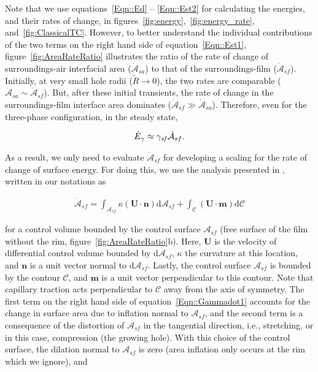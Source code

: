 \begin{subappendices}
	Note that we use equations~\eqref{Eqn::Ed} -- \eqref{Eqn::Est2} for calculating the energies, and their rates of change, in figures~\ref{fig:energy},~\ref{fig:energy_rate}, and~\ref{fig:ClassicalTC}. However, to better understand the individual contributions of the two terms on the right hand side of equation~\eqref{Eqn::Est1}, figure~\ref{fig:AreaRateRatio} illustrates the ratio of the rate of change of surroundings-air interfacial area ($\dot{\mathcal{A}}_{sa}$) to that of the surroundings-film ($\dot{\mathcal{A}}_{sf}$). Initially, at very small hole radii ($\tilde{R} \to 0$), the two rates are comparable ($\dot{\mathcal{A}}_{sa} \sim \dot{\mathcal{A}}_{sf}$). But, after these initial transients, the rate of change in the surroundings-film interface area dominates ($\dot{\mathcal{A}}_{sf} \gg \dot{\mathcal{A}}_{sa}$).  Therefore, even for the three-phase configuration, in the steady state,
	
	\begin{align}
		\label{Eqn::Est3}
		\dot{E}_\gamma \approx \gamma_\mathit{sf}\dot{\mathcal{A}}_{sf}.
	\end{align}
	
	As a result, we only need to evaluate $\dot{\mathcal{A}}_{sf}$ for developing a scaling for the rate of change of surface energy. For doing this, we use the analysis presented in \cite{bohr2021surface}, written in our notations as 
	
	\begin{align}
		\label{Eqn::Gammadot1}
		\dot{\mathcal{A}}_{sf} = \int_{\mathcal{A}_{sf}} \kappa\left(\boldsymbol{U}\cdot\boldsymbol{n}\right)\mathrm{d}\mathcal{A}_{sf} + \int_{\mathcal{C}}\left(\boldsymbol{U}\cdot\boldsymbol{m}\right)\mathrm{d}\mathcal{C}
	\end{align} 
	
	\noindent for a control volume bounded by the control surface $\mathcal{A}_{sf}$ (free surface of the film without the rim, figure~\ref{fig:AreaRateRatio}b). Here, $\boldsymbol{U}$ is the velocity of differential control volume bounded by $\mathrm{d}\mathcal{A}_{sf}$, $\kappa$ the curvature at this location, and $\boldsymbol{n}$ is a unit vector normal to $\mathrm{d}\mathcal{A}_{sf}$. Lastly, the control surface $\mathcal{A}_{sf}$ is bounded by the contour $\mathcal{C}$, and $\boldsymbol{m}$ is a unit vector perpendicular to this contour. Note that capillary traction acts perpendicular to $\mathcal{C}$ away from the axis of symmetry. The first term on the right hand side of equation~\eqref{Eqn::Gammadot1} accounts for the change in surface area due to inflation normal to $\mathcal{A}_{sf}$, and the second term is a consequence of the distortion of $\mathcal{A}_{sf}$ in the tangential direction, i.e., stretching, or in this case, compression (the growing hole). With this choice of the control surface, the dilation normal to $\mathcal{A}_{sf}$ is zero (area inflation only occurs at the rim which we ignore), and
	

\end{subappendices}
